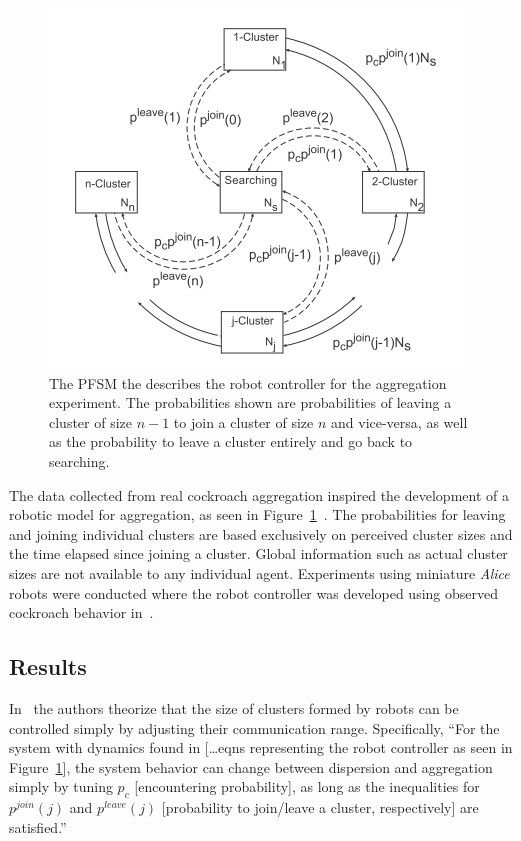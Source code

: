 \documentclass[Main.tex]{subfiles}
\begin{document}
\begin{figure}[!htb]
\centering\includegraphics[width=.5\textwidth]{assets/aggfsm.png}
\caption{The PFSM the describes the robot controller for the aggregation experiment. The probabilities shown are probabilities of leaving a cluster of size $n-1$ to join a cluster of size $n$ and vice-versa, as well as the probability to leave a cluster entirely and go back to searching.}\label{fig:aggfsm}
\end{figure}

The data collected from real cockroach aggregation inspired the development of a robotic model for aggregation, as seen in Figure~\ref{fig:aggfsm}~\cite{Correll2007a}. The probabilities for leaving and joining individual clusters are based exclusively on perceived cluster sizes and the time elapsed since joining a cluster. Global information such as actual cluster sizes are not available to any individual agent. Experiments using miniature \emph{Alice} robots were conducted where the robot controller was developed using observed cockroach behavior in~\cite{Jeanson2005}.

\subsection*{Results}
In~\cite{Correll2011} the authors theorize that the size of clusters formed by robots can be controlled simply by adjusting their communication range. Specifically, ``For the system with dynamics found in [\ldots eqns representing the robot controller as seen in Figure~\ref{fig:aggfsm}], the system behavior can change between dispersion and aggregation simply by tuning $p_c$ [encountering probability], as long as the inequalities for $p^{join}(j)$ and $p^{leave}(j)$ [probability to join/leave a cluster, respectively] are satisfied.''
\end{document}
